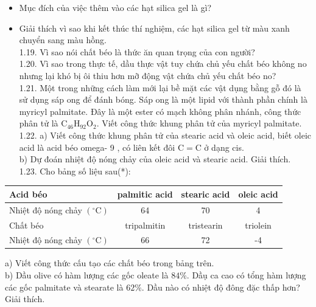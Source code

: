 \documentclass[10pt]{article}
\begin{document}
\begin{itemize}
  \item Mục đích của việc thêm vào các hạt silica gel là gì?
  \item Giải thích vì sao khi kết thúc thí nghiệm, các hạt silica gel từ màu xanh chuyển sang màu hồng.\\
1.19. Vì sao nói chất béo là thức ăn quan trọng của con người?\\
1.20. Vì sao trong thực tế, dầu thực vật tuy chứa chủ yếu chất béo không no nhưng lại khó bị ôi thiu hơn mỡ động vật chứa chủ yếu chất béo no?\\
1.21. Một trong những cách làm mới lại bề mặt các vật dụng bằng gỗ đó là sử dụng sáp ong để đánh bóng. Sáp ong là một lipid với thành phần chính là myricyl palmitate. Đây là một ester có mạch không phân nhánh, công thức phân tử là $\mathrm{C}_{46} \mathrm{H}_{92} \mathrm{O}_{2}$. Viết công thức khung phân tử của myricyl palmitate.\\
1.22. a) Viết công thức khung phân tử của stearic acid và oleic acid, biết oleic acid là acid béo omega- 9 , có liên kết đôi $\mathrm{C}=\mathrm{C}$ ở dạng cis.\\
b) Dự đoán nhiệt độ nóng chảy của oleic acid và stearic acid. Giải thích.\\
1.23. Cho bảng số liệu sau(*):
\end{itemize}

\begin{center}
\begin{tabular}{|l|c|c|c|}
\hline
Acid béo & palmitic acid & stearic acid & oleic acid \\
\hline
Nhiệt độ nóng chảy $\left({ }^{\circ} \mathrm{C}\right)$ & 64 & 70 & 4 \\
\hline
Chất béo & tripalmitin & tristearin & triolein \\
\hline
Nhiệt độ nóng chảy $\left({ }^{\circ} \mathrm{C}\right)$ & 66 & 72 & -4 \\
\hline
\end{tabular}
\end{center}

a) Viết công thức cấu tạo các chất béo trong bảng trên.\\
b) Dầu olive có hàm lượng các gốc oleate là $84 \%$. Dầụ ca cao có tổng hàm lượng các gốc palmitate và stearate là $62 \%$. Dầu nào có nhiệt độ đông đặc thấp hơn? Giải thích.
\end{document}
